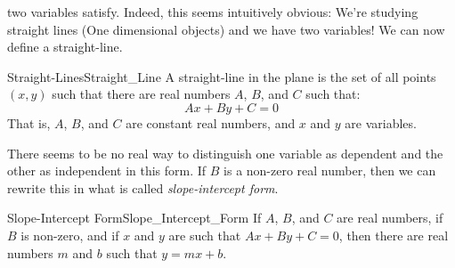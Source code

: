 \documentclass[crop=false,class=book,oneside]{standalone}                      %
\begin{document}
            two variables satisfy. Indeed, this seems intuitively obvious:
            We're studying straight lines (One dimensional objects) and we
            have two variables! We can now define a straight-line.
            \begin{ldefinition}{Straight-Lines}{Straight_Line}
                A straight-line in the plane is the set of all points $(x,y)$
                such that there are real numbers $A$, $B$, and $C$ such that:
                \begin{equation}
                    Ax+By+C=0
                \end{equation}
                That is, $A$, $B$, and $C$ are constant real numbers, and
                $x$ and $y$ are variables.
            \end{ldefinition}
            There seems to be no real way to distinguish one variable as
            dependent and the other as independent in this form. If $B$ is a
            non-zero real number, then we can rewrite this in what is called
            \textit{slope-intercept form}.
            \newpage
            \begin{ltheorem}{Slope-Intercept Form}{Slope_Intercept_Form}
                If $A$, $B$, and $C$ are real numbers, if $B$ is non-zero, and
                if $x$ and $y$ are such that $Ax+By+C=0$, then there are real
                numbers $m$ and $b$ such that $y=mx+b$.
            \end{ltheorem}
\end{document}
